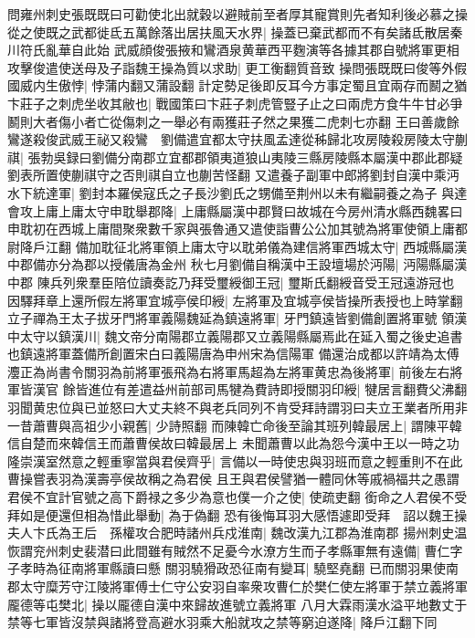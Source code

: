 問雍州刺史張既既曰可勸使北出就穀以避賊前至者厚其寵賞則先者知利後必慕之操從之使既之武都徙氐五萬餘落出居扶風天水界|{
	操蓋已棄武都而不有矣諸氐散居秦川符氏亂華自此始}
武威顔俊張掖和鸞酒泉黄華西平麴演等各據其郡自號將軍更相攻擊俊遣使送母及子詣魏王操為質以求助|{
	更工衡翻質音致}
操問張既既曰俊等外假國威内生傲悖|{
	悖蒲内翻又蒲設翻}
計定勢足後即反耳今方事定蜀且宜兩存而鬭之猶卞莊子之刺虎坐收其敝也|{
	戰國策曰卞莊子刺虎管豎子止之曰兩虎方食牛牛甘必爭鬭則大者傷小者亡從傷刺之一舉必有兩獲莊子然之果獲二虎刺七亦翻}
王曰善歲餘鸞遂殺俊武威王祕又殺鸞　劉備遣宜都太守扶風孟達從秭歸北攻房陵殺房陵太守蒯祺|{
	張勃吳録曰劉備分南郡立宜都郡領夷道狼山夷陵三縣房陵縣本屬漢中郡此郡疑劉表所置使蒯祺守之否則祺自立也蒯苦怪翻}
又遣養子副軍中郎將劉封自漢中乘沔水下統達軍|{
	劉封本羅侯寇氏之子長沙劉氏之甥備至荆州以未有繼嗣養之為子}
與達會攻上庸上庸太守申耽舉郡降|{
	上庸縣屬漢中郡賢曰故城在今房州清水縣西魏畧曰申耽初在西城上庸間聚衆數千家與張魯通又遣使詣曹公公加其號為將軍使領上庸都尉降戶江翻}
備加耽征北將軍領上庸太守以耽弟儀為建信將軍西城太守|{
	西城縣屬漢中郡備亦分為郡以授儀唐為金州}
秋七月劉備自稱漢中王設壇場於沔陽|{
	沔陽縣屬漢中郡}
陳兵列衆羣臣陪位讀奏訖乃拜受璽綬御王冠|{
	璽斯氏翻綬音受王冠遠游冠也}
因驛拜章上還所假左將軍宜城亭侯印綬|{
	左將軍及宜城亭侯皆操所表授也上時掌翻}
立子禪為王太子拔牙門將軍義陽魏延為鎮遠將軍|{
	牙門鎮遠皆劉備創置將軍號}
領漢中太守以鎮漢川|{
	魏文帝分南陽郡立義陽郡又立義陽縣屬焉此在延入蜀之後史追書也鎮遠將軍蓋備所創置宋白曰義陽唐為申州宋為信陽軍}
備還治成都以許靖為太傅灋正為尚書令關羽為前將軍張飛為右將軍馬超為左將軍黄忠為後將軍|{
	前後左右將軍皆漢官}
餘皆進位有差遣益州前部司馬犍為費詩即授關羽印綬|{
	犍居言翻費父沸翻}
羽聞黄忠位與已並怒曰大丈夫終不與老兵同列不肯受拜詩謂羽曰夫立王業者所用非一昔蕭曹與高祖少小親舊|{
	少詩照翻}
而陳韓亡命後至論其班列韓最居上|{
	謂陳平韓信自楚而來韓信王而蕭曹侯故曰韓最居上}
未聞蕭曹以此為怨今漢中王以一時之功隆崇漢室然意之輕重寧當與君侯齊乎|{
	言備以一時使忠與羽班而意之輕重則不在此曹操嘗表羽為漢壽亭侯故稱之為君侯}
且王與君侯譬猶一體同休等戚禍福共之愚謂君侯不宜計官號之高下爵禄之多少為意也僕一介之使|{
	使疏吏翻}
銜命之人君侯不受拜如是便還但相為惜此舉動|{
	為于偽翻}
恐有後悔耳羽大感悟遽即受拜　詔以魏王操夫人卞氏為王后　孫權攻合肥時諸州兵戍淮南|{
	魏改漢九江郡為淮南郡}
揚州刺史温恢謂兖州刺史裴潜曰此間雖有賊然不足憂今水潦方生而子孝縣軍無有遠備|{
	曹仁字子孝時為征南將軍縣讀曰懸}
關羽驍猾政恐征南有變耳|{
	驍堅堯翻}
已而關羽果使南郡太守糜芳守江陵將軍傅士仁守公安羽自率衆攻曹仁於樊仁使左將軍于禁立義將軍龎德等屯樊北|{
	操以龎德自漢中來歸故進號立義將軍}
八月大霖雨漢水溢平地數丈于禁等七軍皆沒禁與諸將登高避水羽乘大船就攻之禁等窮迫遂降|{
	降戶江翻下同}
